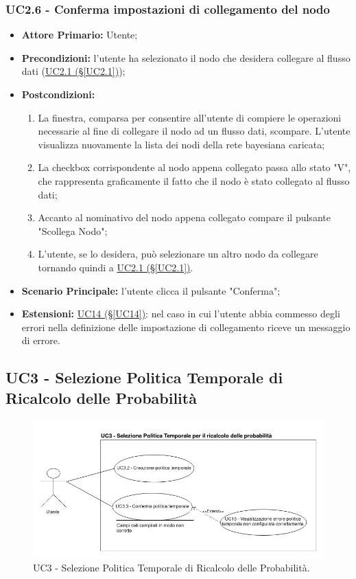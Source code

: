 \subsubsection{UC2.6 - Conferma impostazioni di collegamento del nodo}\label{UC2.6}
\begin{itemize}
\item \textbf{Attore Primario:} Utente;
\item \textbf{Precondizioni:} l'utente ha selezionato il nodo che desidera collegare al flusso dati 					(\hyperref[UC2.1]{UC2.1 (§\ref*{UC2.1})});
\item \textbf{Postcondizioni:}
	\begin{enumerate}
	\item La finestra, comparsa per consentire all'utente di compiere le operazioni necessarie al fine di collegare il 		nodo ad un flusso dati, scompare. L'utente visualizza nuovamente la lista dei nodi della rete bayesiana caricata;
	\item La checkbox corrispondente al nodo appena collegato passa allo stato "V", che rappresenta graficamente il fatto che il nodo è stato collegato al flusso dati;
	\item Accanto al nominativo del nodo appena collegato compare il pulsante "Scollega Nodo";
	\item L'utente, se lo desidera, può selezionare un altro nodo da collegare tornando quindi a \hyperref[UC2.1]{UC2.1 (§\ref*{UC2.1})}.
	\end{enumerate}
\item \textbf{Scenario Principale:} l'utente clicca il pulsante "Conferma";
\item \textbf{Estensioni:} \hyperref[UC14]{UC14 (§\ref*{UC14})}: nel caso in cui l'utente abbia commesso degli errori nella definizione delle impostazione di collegamento riceve un messaggio di errore.
\end{itemize}

\pagebreak

\subsection{UC3 - Selezione Politica Temporale di Ricalcolo delle Probabilità}\label{UC3}

\begin{figure}[H]
\centering
\includegraphics[scale=0.5]{./images/UC3.png}
\caption{UC3 - Selezione Politica Temporale di Ricalcolo delle Probabilità.}
\end{figure}

